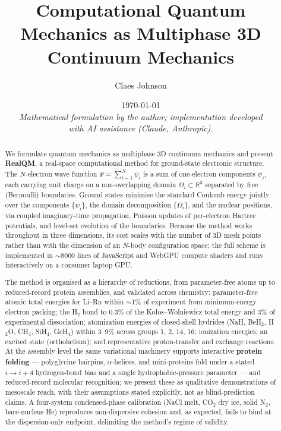 \documentclass[11pt]{article}
\title{Computational Quantum Mechanics as Multiphase 3D Continuum Mechanics}
\author[1]{Claes Johnson}
\affil[1]{KTH Royal Institute of Technology, Stockholm, Sweden \\
\texttt{claesjohnson@gmail.com}}
\date{\today \\[0.4em]
\small\textit{Mathematical formulation by the author; implementation developed} \\
\small\textit{with AI assistance (Claude, Anthropic).}}
\begin{document}
\maketitle

\begin{abstract}
We formulate quantum mechanics as multiphase 3D continuum mechanics and present \textbf{RealQM}, a real-space computational method for ground-state electronic structure. The $N$-electron wave function $\Psi = \sum_{i=1}^{N} \psi_i$ is a sum of one-electron components $\psi_i$, each carrying unit charge on a non-overlapping domain $\Omega_i \subset \mathbb{R}^3$ separated by free (Bernoulli) boundaries. Ground states minimise the standard Coulomb energy jointly over the components $\{\psi_i\}$, the domain decomposition $\{\Omega_i\}$, and the nuclear positions, via coupled imaginary-time propagation, Poisson updates of per-electron Hartree potentials, and level-set evolution of the boundaries. Because the method works throughout in three dimensions, its cost scales with the number of 3D mesh points rather than with the dimension of an $N$-body configuration space; the full scheme is implemented in ${\sim}8000$ lines of JavaScript and WebGPU compute shaders and runs interactively on a consumer laptop GPU.

The method is organised as a hierarchy of reductions, from parameter-free atoms up to reduced-record protein assemblies, and validated across chemistry: parameter-free atomic total energies for Li--Rn within ${\sim}1\%$ of experiment from minimum-energy electron packing; the H$_2$ bond to $0.3\%$ of the Ko\l{}os--Wolniewicz total energy and $3\%$ of experimental dissociation; atomization energies of closed-shell hydrides (NaH, BeH$_2$, H$_2$O, CH$_4$, SiH$_4$, GeH$_4$) within $3$--$9\%$ across groups 1, 2, 14, 16; ionization energies; an excited state (orthohelium); and representative proton-transfer and exchange reactions. At the assembly level the same variational machinery supports interactive \textbf{protein folding} --- polyglycine hairpins, $\alpha$-helices, and mini-proteins fold under a stated $i{\to}i{+}4$ hydrogen-bond bias and a single hydrophobic-pressure parameter --- and reduced-record molecular recognition; we present these as qualitative demonstrations of mesoscale reach, with their assumptions stated explicitly, not as blind-prediction claims. A four-system condensed-phase calibration (NaCl melt, CO$_2$ dry ice, solid N$_2$, bare-nucleus He) reproduces non-dispersive cohesion and, as expected, fails to bind at the dispersion-only endpoint, delimiting the method's regime of validity.


\end{abstract}
\end{document}

